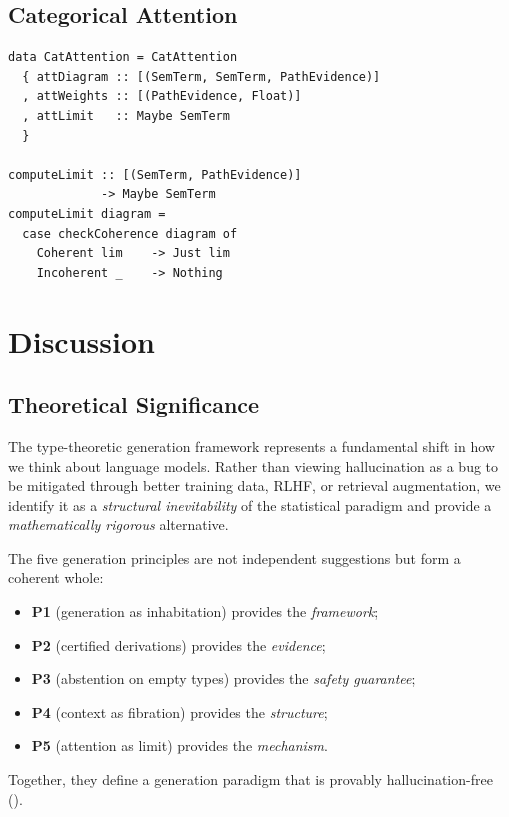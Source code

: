 \documentclass[11pt,a4paper]{article}
\theoremstyle{plain}
\theoremstyle{definition}
\theoremstyle{remark}
\begin{document}
\subsection{Categorical Attention}

\begin{lstlisting}[caption={Categorical attention as weighted limit}]
data CatAttention = CatAttention
  { attDiagram :: [(SemTerm, SemTerm, PathEvidence)]
  , attWeights :: [(PathEvidence, Float)]
  , attLimit   :: Maybe SemTerm
  }

computeLimit :: [(SemTerm, PathEvidence)]
             -> Maybe SemTerm
computeLimit diagram =
  case checkCoherence diagram of
    Coherent lim    -> Just lim
    Incoherent _    -> Nothing
\end{lstlisting}


\section{Discussion}\label{sec:discussion}

\subsection{Theoretical Significance}

The type-theoretic generation framework represents a fundamental shift in how we think about language models.
Rather than viewing hallucination as a bug to be mitigated through better training data, RLHF, or retrieval augmentation, we identify it as a \emph{structural inevitability} of the statistical paradigm and provide a \emph{mathematically rigorous} alternative.

The five generation principles are not independent suggestions but form a coherent whole:
\begin{itemize}[nosep]
  \item \textbf{P1} (generation as inhabitation) provides the \emph{framework};
  \item \textbf{P2} (certified derivations) provides the \emph{evidence};
  \item \textbf{P3} (abstention on empty types) provides the \emph{safety guarantee};
  \item \textbf{P4} (context as fibration) provides the \emph{structure};
  \item \textbf{P5} (attention as limit) provides the \emph{mechanism}.
\end{itemize}
Together, they define a generation paradigm that is provably hallucination-free ().
\end{document}
